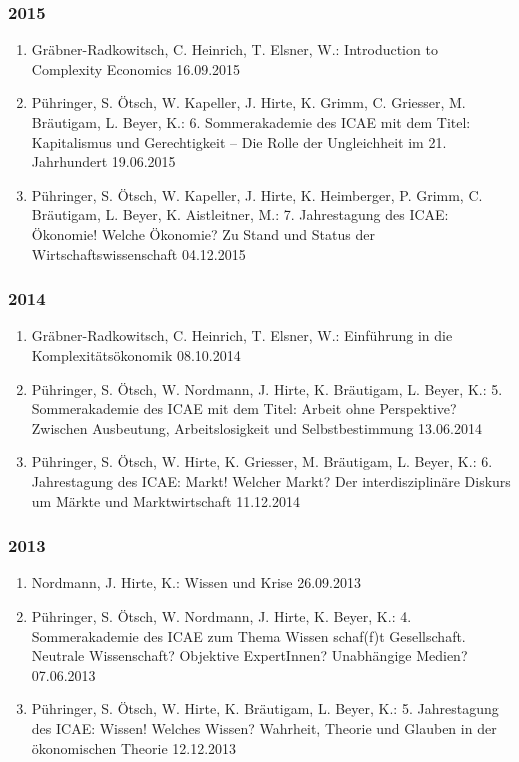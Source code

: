 \subsubsection*{2015}
\begin{enumerate}
	\item Gräbner-Radkowitsch, C. Heinrich, T.  Elsner, W.: Introduction to Complexity Economics 16.09.2015
	\item Pühringer, S. Ötsch, W. Kapeller, J. Hirte, K. Grimm, C. Griesser, M. Bräutigam, L. Beyer, K.: 6. Sommerakademie des ICAE mit dem Titel: Kapitalismus und Gerechtigkeit -- Die Rolle der Ungleichheit im 21. Jahrhundert 19.06.2015
	\item Pühringer, S. Ötsch, W. Kapeller, J. Hirte, K. Heimberger, P. Grimm, C. Bräutigam, L. Beyer, K. Aistleitner, M.: 7. Jahrestagung des ICAE: Ökonomie! Welche Ökonomie? Zu Stand und Status der Wirtschaftswissenschaft 04.12.2015
\end{enumerate}
\subsubsection*{2014}
\begin{enumerate}
	\item Gräbner-Radkowitsch, C. Heinrich, T.  Elsner, W.: Einführung in die Komplexitätsökonomik 08.10.2014
	\item Pühringer, S. Ötsch, W. Nordmann, J. Hirte, K. Bräutigam, L. Beyer, K.: 5. Sommerakademie des ICAE mit dem Titel: Arbeit ohne Perspektive? Zwischen Ausbeutung, Arbeitslosigkeit und Selbstbestimmung 13.06.2014
	\item Pühringer, S. Ötsch, W. Hirte, K. Griesser, M. Bräutigam, L. Beyer, K.: 6. Jahrestagung des ICAE: Markt! Welcher Markt? Der interdisziplinäre Diskurs um Märkte und Marktwirtschaft 11.12.2014
\end{enumerate}
\subsubsection*{2013}
\begin{enumerate}
	\item Nordmann, J. Hirte, K.: Wissen und Krise 26.09.2013
	\item Pühringer, S. Ötsch, W. Nordmann, J. Hirte, K. Beyer, K.: 4. Sommerakademie des ICAE zum Thema Wissen schaf(f)t Gesellschaft. Neutrale Wissenschaft? Objektive ExpertInnen? Unabhängige Medien? 07.06.2013
	\item Pühringer, S. Ötsch, W. Hirte, K. Bräutigam, L. Beyer, K.: 5. Jahrestagung des ICAE: Wissen! Welches Wissen? Wahrheit, Theorie und Glauben in der ökonomischen Theorie 12.12.2013
\end{enumerate}
